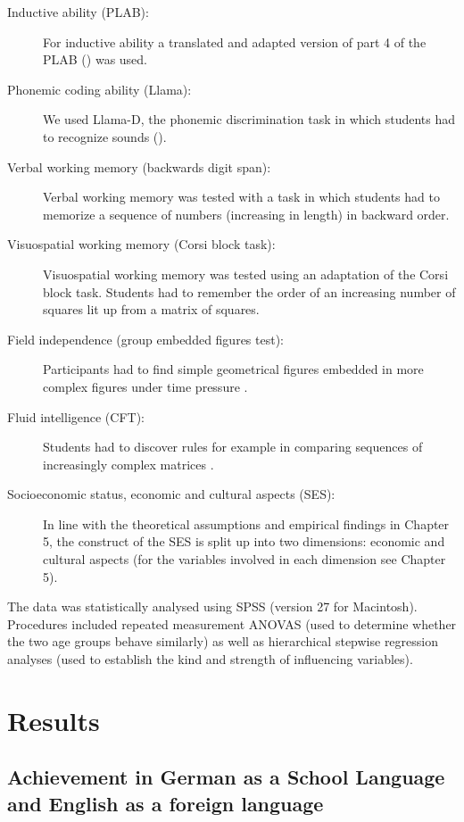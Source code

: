 \documentclass[output=paper]{langsci/langscibook}
\begin{document}
\begin{description}
\item[Inductive ability (PLAB):]
For inductive ability a translated and adapted version of part 4 of the PLAB (\citealt{PimsleurEtAl2004}) was used.
\item[Phonemic coding ability (Llama):]
We used Llama-D, the phonemic discrimination task in which students had to recognize sounds (\citealt{MearaEtAl2001}).
\item[Verbal working memory (backwards digit span):]
Verbal working memory was tested with a task in which students had to memorize a sequence of numbers (increasing in length) in backward order.
\item[Visuospatial working memory (Corsi block task):]
Visuospatial working memory was tested using an adaptation of the Corsi block task. Students had to remember the order of an increasing number of squares lit up from a matrix of squares.
\item[Field independence (group embedded figures test):]
Participants had to find simple geometrical figures embedded in more complex figures under time pressure \citep{OltmanEtAl1971}.
\item[Fluid intelligence (CFT):]
Students had to discover rules for example in comparing sequences of increasingly complex matrices \citep{Weiss2006}.
\item[Socioeconomic status, economic and cultural aspects (SES):]
In line with the theoretical assumptions and empirical findings in Chapter 5, the construct of the SES is split up into two dimensions: economic and cultural aspects (for the variables involved in each dimension see Chapter 5).
\end{description}

The data was statistically analysed using SPSS (version 27 for Macintosh). Procedures included repeated measurement ANOVAS (used to determine whether the two age groups behave similarly) as well as hierarchical stepwise regression analyses (used to establish the kind and strength of influencing variables).

\section{Results}
\subsection{ Achievement in German as a School Language and English as a foreign language} %
\end{document}
